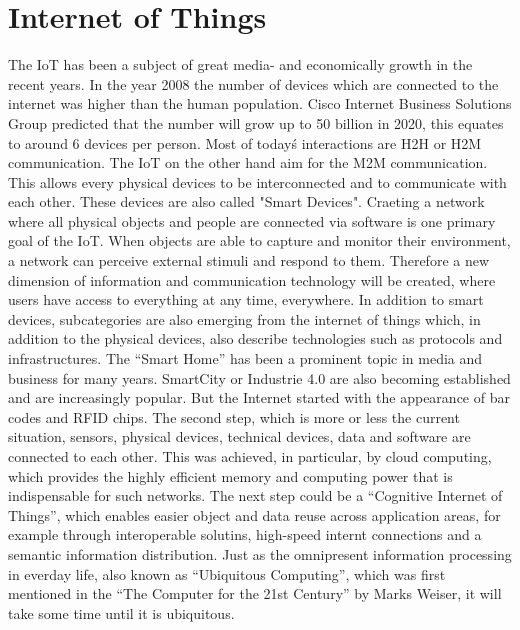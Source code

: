 \section{Internet of Things}
The \ac{IoT} has been a subject of great media- and economically growth in the recent years.
In the year 2008 the number of devices which are connected to the internet was higher than the human population.\cite[cf.]{Eva11}
Cisco Internet Business Solutions Group predicted that the number will grow up to 50 billion in 2020, this equates to around 6 devices per person.\cite[cf.]{Eva11}
Most of today\'s interactions are \ac{H2H} or \ac{H2M} communication.
The \ac{IoT} on the other hand aim for the \ac{M2M} communication.
This allows every physical devices to be interconnected and to communicate with each other.
These devices are also called "Smart Devices".
Craeting a network where all physical objects and people are connected via software is one primary goal of the \ac{IoT}.\cite[cf.]{Rui2015}\cite[cf.]{Kra13}
When objects are able to capture and monitor their environment, a network can perceive external stimuli and respond to them.\cite[cf.][p. 40]{Itu11}
Therefore a new dimension of information and communication technology will be created, where users have access to everything at any time, everywhere.
In addition to smart devices, subcategories are also emerging from the internet of things which, in addition to the physical devices, also describe technologies such as protocols and infrastructures.
The "`Smart Home"' has been a prominent topic in media and business for many years.
SmartCity or Industrie 4.0 are also becoming established and are increasingly popular.
But the Internet started with the appearance of bar codes and \ac{RFID} chips.\cite[cf.]{Kra13}
The second step, which is more or less the current situation, sensors, physical devices, technical devices, data and software are connected to each other.\cite[cf.]{Kra13}
This was achieved, in particular, by cloud computing, which provides the highly efficient memory and computing power that is indispensable for such networks.\cite[cf.]{Rui2015}
The next step could be a "`Cognitive Internet of Things"', which enables easier object and data reuse across application areas, for example through interoperable solutins, high-speed internt connections and a semantic information distribution.\cite[cf.]{Kra13}
Just as the omnipresent information processing in everday life, also known as "`Ubiquitous Computing"', which was first mentioned in the "`The Computer for the 21st Century"'\cite[cf.]{Wei91} by Marks Weiser, it will take some time until it is ubiquitous.


